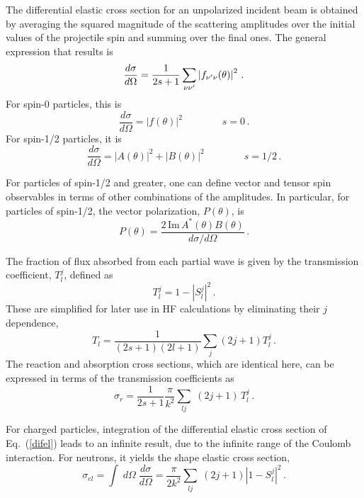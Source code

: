 The differential elastic cross section for an unpolarized incident beam is
obtained by averaging the squared magnitude of the scattering amplitudes
over the initial values of the projectile spin and summing over the final
ones. The general expression that results is
\begin{equation}
\frac{d\sigma}{d\Omega}=\frac{1}{2s+1}\sum_{\nu\nu^{\prime}}\left|f_{\nu^{%
\prime}\nu}(\theta)\right|^{2}\,.  \label{difel}
\end{equation}
For spin-0 particles, this is
\begin{equation}
\frac{d\sigma}{d\Omega}=\left|f(\theta)\right|^{2}\qquad\qquad s=0\,.
\end{equation}
For spin-1/2 particles, it is
\begin{equation}
\frac{d\sigma}{d\Omega}=\left|A(\theta)\right|^{2}+\left|B(\theta)%
\right|^{2}\qquad\qquad s=1/2\,.
\end{equation}

For particles of spin-1/2 and greater, one can define vector and tensor spin
observables in terms of other combinations of the amplitudes. In particular,
for particles of spin-1/2, the vector polarization, $P(\theta)$, is
\begin{equation}
P(\theta)=\frac{2\,\text{Im}\, A^{*}(\theta)B(\theta)}{d\sigma/d\Omega}\,.
\end{equation}

The fraction of flux absorbed from each partial wave is given by the
transmission coefficient, $T_{l}^{j}$, defined as
\begin{equation}
T_{l}^{j}=1-\left|S_{l}^{j}\right|^{2}\,.
\end{equation}
These are simplified for later use in HF calculations by eliminating their $%
j $ dependence,
\begin{equation}
T_{l}=\frac{1}{(2s+1)(2l+1)}\sum_j (2j+1) T_{l}^{j}\,.
\end{equation}
The reaction and absorption cross sections, which are identical here, can be
expressed in terms of the transmission coefficients as
\begin{equation}
\sigma_{r}=\frac{1}{2s+1}\frac{\pi}{k^{2}}\sum_{lj}\;(2j+1)\, T_{l}^{j}\,.
\end{equation}

For charged particles, integration of the differential elastic cross section
of Eq.~(\ref{difel}) leads to an infinite result, due to the infinite range
of the Coulomb interaction. For neutrons, it yields the shape elastic cross
section,
\begin{equation}
\sigma_{el}=\int\; d\Omega\;\frac{d\sigma}{d\Omega}=\frac{\pi}{2k^{2}}%
\sum_{lj}\;(2j+1)\left|1-S_{l}^{j}\right|^{2}\,.
\end{equation}

